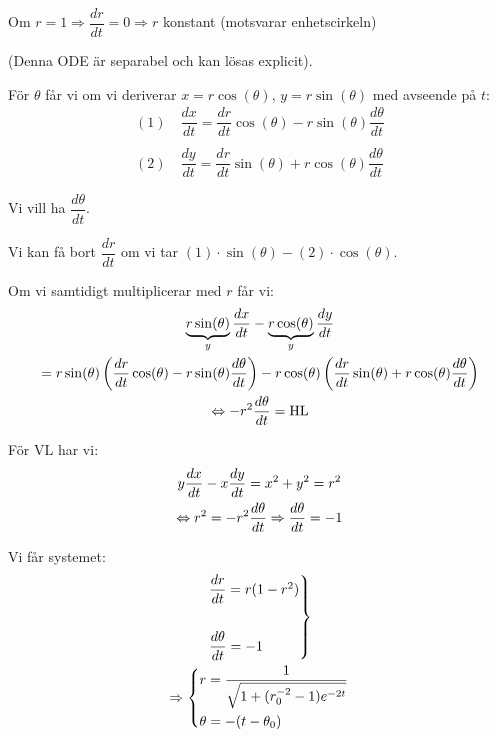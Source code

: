 \noindent Om $r=1\Rightarrow\dfrac{dr}{dt}=0\Rightarrow r$ konstant (motsvarar enhetscirkeln)
\par\bigskip
\noindent (Denna ODE är separabel och kan lösas explicit).
\par\bigskip
\noindent För $\theta$ får vi om vi deriverar $x=r\cos(\theta)$, $y=r\sin(\theta)$ med avseende på $t$:
\begin{equation*}
  \begin{gathered}
    (1) \quad\dfrac{dx}{dt} = \dfrac{dr}{dt}\cos(\theta)-r\sin(\theta)\dfrac{d\theta}{dt}\\\\
    (2) \quad\dfrac{dy}{dt} = \dfrac{dr}{dt}\sin(\theta)+r\cos(\theta)\dfrac{d\theta}{dt}
  \end{gathered}
\end{equation*}
\par\bigskip
\noindent Vi vill ha $\dfrac{d\theta}{dt}$.\par
\noindent Vi kan få bort $\dfrac{dr}{dt}$ om vi tar $(1)\cdot\sin(\theta)-(2)\cdot\cos(\theta)$.\par
\noindent Om vi samtidigt multiplicerar med $r$ får vi:
\begin{equation*}
  \begin{gathered}
    \underbrace{r\sin(\theta)}_{\text{$y$}}\dfrac{dx}{dt}-\underbrace{r\cos(\theta)}_{\text{$y$}}\dfrac{dy}{dt}\\
    = r\sin(\theta)\left(\dfrac{dr}{dt}\cos(\theta)-r\sin(\theta)\dfrac{d\theta}{dt}\right)-r\cos(\theta)\left(\dfrac{dr}{dt}\sin(\theta)+r\cos(\theta)\dfrac{d\theta}{dt}\right)\\
    \Leftrightarrow -r^2\dfrac{d\theta}{dt} = \text{HL}
  \end{gathered}
\end{equation*}
\par\bigskip
\noindent För VL har vi:
\begin{equation*}
  \begin{gathered}
    y\dfrac{dx}{dt}-x\dfrac{dy}{dt} = x^2+y^2 = r^2\\
    \Leftrightarrow r^2 = -r^2\dfrac{d\theta}{dt}\Rightarrow\dfrac{d\theta}{dt}=-1
  \end{gathered}
\end{equation*}
\par\bigskip
\noindent Vi får systemet:
\begin{equation*}
  \begin{gathered}
    \begin{rcases*}
      \dfrac{dr}{dt} = r(1-r^2)\\\\
      \dfrac{d\theta}{dt}=-1
    \end{rcases*}\\
    \Rightarrow
    \begin{cases*}
      r = \dfrac{1}{\sqrt{1+(r_0^{-2}-1)e^{-2t}}}\\
      \theta = -(t-\theta_0)
    \end{cases*}
  \end{gathered}
\end{equation*}
